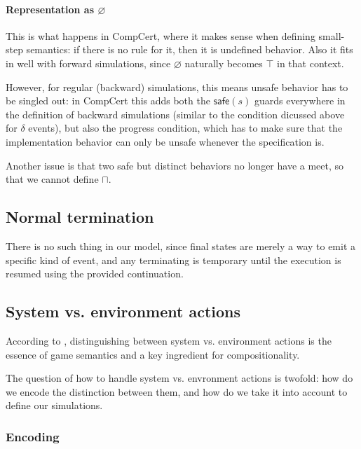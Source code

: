 \documentclass[11pt]{article}
\begin{document}
\paragraph{Representation as $\varnothing$}

This is what happens in CompCert,
where it makes sense when defining small-step semantics:
if there is no rule for it,
then it is undefined behavior.
Also it fits in well with forward simulations,
since $\varnothing$ naturally becomes $\top$ in that context.

However, for regular (backward) simulations,
this means unsafe behavior has to be singled out:
in CompCert this adds both the $\mathsf{safe}(s)$
guards everywhere in the definition of backward simulations
(similar to the condition dicussed above for $\delta$ events),
but also the progress condition,
which has to make sure that the implementation behavior
can only be unsafe whenever the specification is.

Another issue is that
two safe but distinct behaviors no longer have a meet,
so that we cannot define $\sqcap$.


\subsection{Normal termination} %

There is no such thing in our model,
since final states are merely a way to emit
a specific kind of event,
and any terminating is temporary
until the execution is resumed
using the provided continuation.


\subsection{System vs. environment actions} %

According to \cite{cspgs},
distinguishing between system vs. environment actions
is the essence of game semantics
and a key ingredient for compositionality.

The question of how to handle system vs. envronment actions is twofold:
how do we encode the distinction between them, and
how do we take it into account to define our simulations.

\subsubsection{Encoding} %
\end{document}
